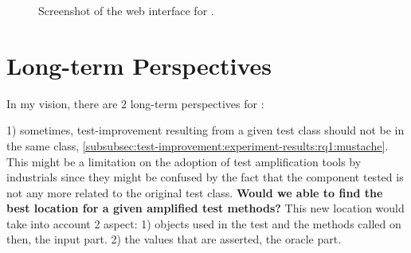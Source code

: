 \begin{figure}
	\centering
	\caption{Screenshot of the web interface for \dspot.}
	\label{fig:dspot-web}
\end{figure}

\section{Long-term Perspectives}
\label{sec:conclusion:long-prespectives}

In my vision, there are 2 long-term perspectives for \dspot:

1) sometimes, test-improvement resulting from a given test class should not be in the same class, \eg \autoref{subsubsec:test-improvement:experiment-results:rq1:mustache}.
This might be a limitation on the adoption of test amplification tools by industrials since they might be confused by the fact that the component tested is not any more related to the original test class.
\textbf{Would we able to find the best location for a given amplified test methods?}
This new location would take into account 2 aspect:
1) objects used in the test and the methods called on then, \ie the input part.
2) the values that are asserted, \ie the oracle part.

